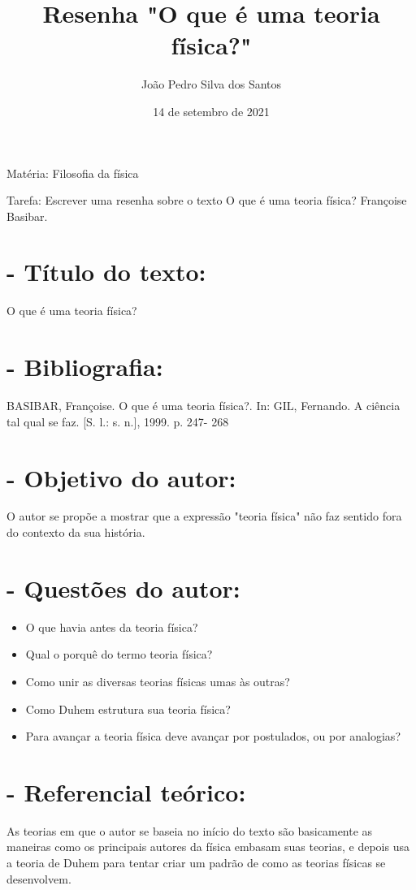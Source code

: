 \documentclass [a4paper, 12pt]{article}
\title{Resenha "O que é uma teoria física?"}
\author{João Pedro Silva dos Santos}
\date{14 de setembro de 2021}
\begin{document}
\maketitle
Matéria: Filosofia da física

Tarefa: Escrever uma resenha sobre o texto O que é uma teoria física? Françoise Basibar.
\section*{- Título do texto:}

O que é uma teoria física?

\section*{-  Bibliografia:}

BASIBAR, Françoise. O que é uma teoria física?. In: GIL, Fernando. A ciência tal qual se faz. [S. l.: s. n.], 1999. p. 247- 268

\section*{- Objetivo do autor:}

O autor se propõe a mostrar que a expressão "teoria física" não faz sentido fora do contexto da sua história.

\section*{- Questões do autor:}

\begin{itemize}
    \item O que havia antes da teoria física?
    \item Qual o porquê do termo teoria física?
    \item Como unir as diversas teorias físicas umas às outras?
    \item Como Duhem estrutura sua teoria física?
    \item Para avançar a teoria física deve avançar por postulados, ou por analogias?

\end{itemize}
\section*{- Referencial teórico:}

As teorias em que o autor se baseia no início do texto são basicamente as maneiras como os principais autores da física embasam suas teorias, e depois usa a teoria de Duhem para tentar criar um padrão de como as teorias físicas se desenvolvem.
\end{document}
